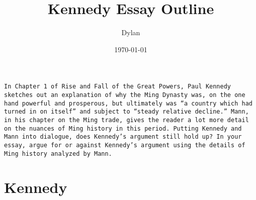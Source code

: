 \documentclass[letterpaper]{article}
\author{Dylan}
\date{\today}
\title{Kennedy Essay Outline}
\renewcommand{\tableofcontents}{}
\begin{document}
\tableofcontents

\begin{verbatim}
In Chapter 1 of Rise and Fall of the Great Powers, Paul Kennedy sketches out an explanation of why the Ming Dynasty was, on the one hand powerful and prosperous, but ultimately was “a country which had turned in on itself” and subject to “steady relative decline.” Mann, in his chapter on the Ming trade, gives the reader a lot more detail on the nuances of Ming history in this period. Putting Kennedy and Mann into dialogue, does Kennedy’s argument still hold up? In your essay, argue for or against Kennedy’s argument using the details of Ming history analyzed by Mann.
\end{verbatim}

\section{Kennedy}
\label{sec:org69a0fe7}
\end{document}
